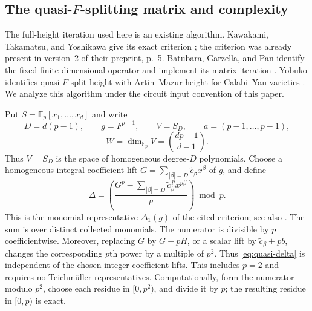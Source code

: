 \subsection{The quasi-\texorpdfstring{$F$}{F}-splitting matrix and complexity}
\label{subsec:quasi-height-complexity}

The full-height iteration used here is an existing algorithm.
Kawakami, Takamatsu, and Yoshikawa give its exact criterion
\citep[Theorem~C, version~3, p.~4; Theorem~5.8, pp.~37--39]{KTY2025};
the criterion was already present in version~2 of their preprint, p.~5.
Batubara, Garzella, and Pan identify the fixed finite-dimensional operator
and implement its matrix iteration
\citep[Section~3.4 and Algorithm~4, p.~7]{BGP2025}.
Yobuko identifies quasi-$F$-split height with Artin--Mazur height for
Calabi--Yau varieties
\citep[Theorem~4.5; author version, pp.~9--10]{Yobuko2019}.
We analyze this algorithm under the circuit input convention of this paper.

Put $S=\mathbb F_p[x_1,\ldots,x_d]$ and write
\[
 D=d(p-1),\qquad g=F^{p-1},\qquad
 V=S_D,\qquad a=(p-1,\ldots,p-1),
\]
\[
 W=\dim_{\mathbb F_p}V=\binom{dp-1}{d-1}.
\]
Thus $V=S_D$ is the space of homogeneous degree-$D$ polynomials.
Choose a homogeneous integral coefficient lift
$G=\sum_{|\beta|=D}\widetilde c_\beta x^\beta$ of $g$, and define
\begin{equation}\label{eq:quasi-delta}
 \Delta=\left(
 \frac{G^p-\sum_{|\beta|=D}\widetilde c_\beta^{\,p}x^{p\beta}}p
 \right)\bmod p.
\end{equation}
This is the monomial representative $\Delta_1(g)$ of the cited criterion;
see also \citet[Proposition~3.2, Remark~3.4 and Algorithm~1, p.~5]{BGP2025}.
The sum is over distinct collected monomials.
The numerator is divisible by $p$ coefficientwise. Moreover, replacing
$G$ by $G+pH$, or a scalar lift by $\widetilde c_\beta+pb$, changes the
corresponding $p$th power by a multiple of $p^2$. Thus
\eqref{eq:quasi-delta} is independent of the chosen integer coefficient
lifts. This includes $p=2$ and requires no Teichm\"uller representatives.
Computationally, form the numerator modulo $p^2$, choose each residue in
$[0,p^2)$, and divide it by $p$; the resulting residue in $[0,p)$ is exact.

